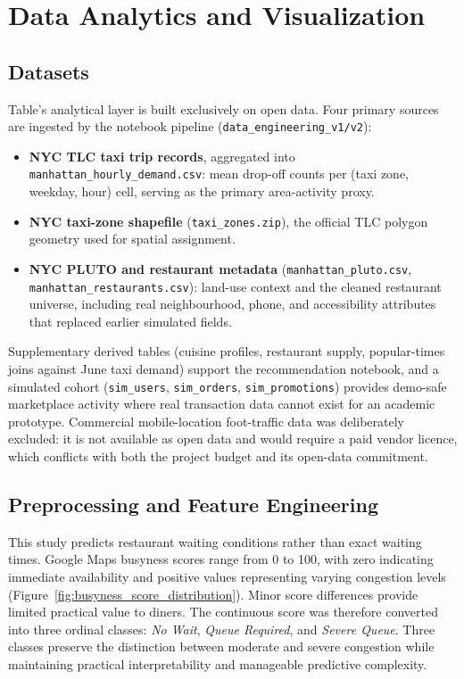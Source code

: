 \documentclass[conference]{IEEEtran}
\begin{document}
\section{Data Analytics and Visualization}

\subsection{Datasets}

Table's analytical layer is built exclusively on open data. Four primary sources are ingested by the notebook pipeline (\texttt{data\_engineering\_v1/v2}):

\begin{itemize}
\item \textbf{NYC TLC taxi trip records}, aggregated into \texttt{manhattan\_hourly\_demand.csv}: mean drop-off counts per (taxi zone, weekday, hour) cell, serving as the primary area-activity proxy.
\item \textbf{NYC taxi-zone shapefile} (\texttt{taxi\_zones.zip}), the official TLC polygon geometry used for spatial assignment.
\item \textbf{NYC PLUTO and restaurant metadata} (\texttt{manhattan\_pluto.csv}, \texttt{manhattan\_restaurants.csv}): land-use context and the cleaned restaurant universe, including real neighbourhood, phone, and accessibility attributes that replaced earlier simulated fields.
\end{itemize}

Supplementary derived tables (cuisine profiles, restaurant supply, popular-times joins against June taxi demand) support the recommendation notebook, and a simulated cohort (\texttt{sim\_users}, \texttt{sim\_orders}, \texttt{sim\_promotions}) provides demo-safe marketplace activity where real transaction data cannot exist for an academic prototype. Commercial mobile-location foot-traffic data was deliberately excluded: it is not available as open data and would require a paid vendor licence, which conflicts with both the project budget and its open-data commitment.

\subsection{Preprocessing and Feature Engineering}

This study predicts restaurant waiting conditions rather than exact waiting times. Google Maps busyness scores range from 0 to 100, with zero indicating immediate availability and positive values representing varying congestion levels (Figure~\ref{fig:busyness_score_distribution}). Minor score differences provide limited practical value to diners. The continuous score was therefore converted into three ordinal classes: \textit{No Wait}, \textit{Queue Required}, and \textit{Severe Queue}. Three classes preserve the distinction between moderate and severe congestion while maintaining practical interpretability and manageable predictive complexity.
\end{document}
